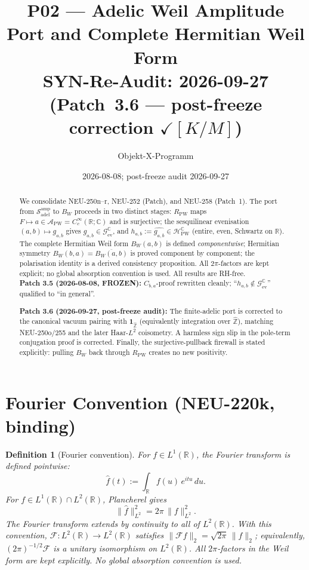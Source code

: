 \documentclass[11pt,a4paper]{amsart}
\title{P02 --- Adelic Weil Amplitude Port and Complete Hermitian Weil Form\\
\normalsize SYN-Re-Audit: 2026-09-27 (Patch~3.6 --- post-freeze correction $\checkmark[K/M]$)}
\author{Objekt-X-Programm}
\date{2026-08-08; post-freeze audit 2026-09-27}
\newtheorem{definition}[theorem]{Definition}
\begin{document}
\maketitle

\begin{abstract}
We consolidate NEU-250n--r, NEU-252 (Patch), and NEU-258 (Patch~1).
The port from $\mathcal{S}_{\mathrm{adel}}^{\mathrm{amp}}$
to $B_W$ proceeds in two distinct stages:
$R_{\mathrm{PW}}$ maps $F\mapsto a\in\mathcal{A}_{\mathrm{PW}}=C_c^\infty(\mathbb{R};\mathbb{C})$
and is surjective;
the sesquilinear evenisation $(a,b)\mapsto g_{a,b}$
gives $g_{a,b}\in\mathcal{G}_{\mathrm{ev}}^{\mathbb{C}}$,
and $h_{a,b}:=\widehat{g_{a,b}}\in\mathcal{H}_{\mathrm{PW}}^{\mathbb{C}}$
(entire, even, Schwartz on $\mathbb{R}$).
The complete Hermitian Weil form $B_W(a,b)$ is defined
\emph{componentwise};
Hermitian symmetry $B_W(b,a)=\overline{B_W(a,b)}$ is proved
component by component;
the polarisation identity is a derived consistency proposition.
All $2\pi$-factors are kept explicit; no global absorption convention is used.
All results are RH-free.\\
\textbf{Patch 3.5 (2026-08-08, FROZEN):}
$C_{b,a}$-proof rewritten cleanly;
``$h_{a,b}\notin\mathcal{G}_{\mathrm{ev}}^{\mathbb{C}}$'' qualified to ``in general''.

\textbf{Patch 3.6 (2026-09-27, post-freeze audit):}
The finite-adelic port is corrected to the canonical vacuum pairing with
$\mathbf{1}_{\widehat{\mathbb Z}}$ (equivalently integration over
$\widehat{\mathbb Z}$), matching NEU-250o/255 and the later Haar-$L^2$
coisometry. A harmless sign slip in the pole-term conjugation proof is corrected.
Finally, the surjective-pullback firewall is stated explicitly: pulling $B_W$
back through $R_{\mathrm{PW}}$ creates no new positivity.
\end{abstract}

\section{Fourier Convention (NEU-220k, binding)}

\begin{definition}[Fourier convention]\label{def:fourier}
For $f\in L^1(\mathbb{R})$, the Fourier transform is defined pointwise:
\[
  \hat{f}(t) := \int_{\mathbb{R}} f(u)\,e^{itu}\,du.
\]
For $f\in L^1(\mathbb{R})\cap L^2(\mathbb{R})$, Plancherel gives
\[
  \|\hat{f}\|_{L^2}^2 = 2\pi\,\|f\|_{L^2}^2.
\]
The Fourier transform extends by continuity to all of $L^2(\mathbb{R})$.
With this convention, $\mathcal{F}:L^2(\mathbb{R})\to L^2(\mathbb{R})$
satisfies $\|\mathcal{F}f\|_2=\sqrt{2\pi}\,\|f\|_2$;
equivalently, $(2\pi)^{-1/2}\mathcal{F}$ is a unitary isomorphism on $L^2(\mathbb{R})$.
All $2\pi$-factors in the Weil form are kept explicitly.
No global absorption convention is used.
\end{definition}
\end{document}
